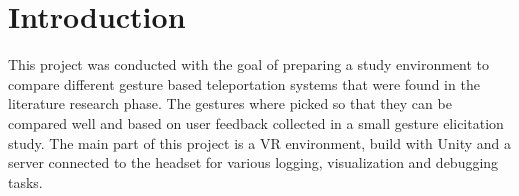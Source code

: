
\section{Introduction}
This project was conducted with the goal of preparing a study environment to compare different gesture based teleportation systems that were found in the literature research phase. The gestures where picked so that they can be compared well and based on user feedback collected in a small gesture elicitation study. The main part of this project is a VR environment, build with Unity and a server connected to the headset for various logging, visualization and debugging tasks.
